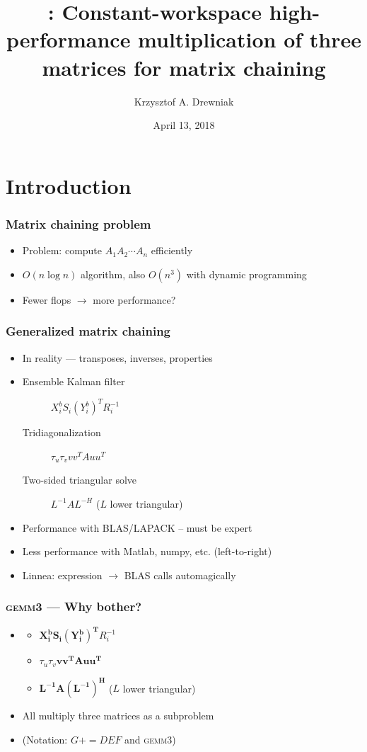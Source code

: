 \documentclass{beamer}
\title[\gemmt{}]{\gemmt{}: Constant-workspace high-performance multiplication of three matrices for matrix chaining}
\author[Drewniak]{Krzysztof A. Drewniak}
\institute[UT Austin]{The University of Texas at Austin}
\date[]{April 13, 2018}
\newcommand*{\pluseq}{\mathrel{{+}{=}}}
\newcommand*{\gemmt}{{\textsc{gemm3}}}
\begin{document}
\begin{frame}[plain]
  \titlepage{}
\end{frame}

\section[Introduction]{Introduction}
\begin{frame}
  \frametitle{Matrix chaining problem}
  \begin{itemize}
  \item Problem: compute $A_1A_2\cdots A_n$ efficiently
  \item $O(n \log n)$ algorithm, also $O(n^3)$ with dynamic programming
  \item Fewer flops $\to$ more performance?
  \end{itemize}
\end{frame}

\begin{frame}
  \frametitle{Generalized matrix chaining}
  \begin{itemize}
  \item In reality --- transposes, inverses, properties
  \item
    \begin{description}
    \item[Ensemble Kalman filter] $X_i^b S_i (Y_i^b)^T R_i^{-1}$
    \item[Tridiagonalization] $\tau_u\tau_vvv^TAuu^T$
    \item[Two-sided triangular solve] $L^{-1}AL^{-H}$ ($L$ lower triangular)
    \end{description}
  \item Performance with BLAS/LAPACK -- must be expert
  \item Less performance with  Matlab, numpy, etc. (left-to-right)
  \item Linnea: expression $\to$ BLAS calls automagically
  \end{itemize}
\end{frame}

\begin{frame}
  \frametitle{\gemmt{} --- Why bother?}
  \begin{itemize}
  \item
    \begin{itemize}
    \item $\bm{X_i^b S_i (Y_i^b)^T}R_i^{-1}$
    \item $\tau_u\tau_v \bm{vv^TAuu^T}$
    \item$\bm{L^{-1}A(L^{-1})^H}$ ($L$ lower triangular)
    \end{itemize}
  \item All multiply three matrices as a subproblem
  \item (Notation: $G \pluseq DEF$ and \gemmt{})
  \end{itemize}
\end{frame}
\end{document}
